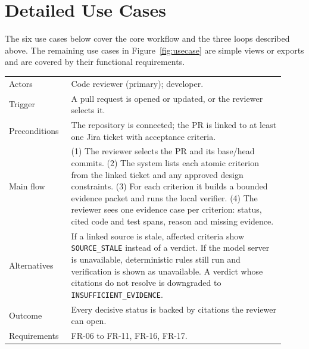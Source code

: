\section{Detailed Use Cases}
\label{sec:detailed-usecases}

The six use cases below cover the core workflow and the three loops described
above. The remaining use cases in Figure~\ref{fig:usecase} are simple views or
exports and are covered by their functional requirements.

\newcommand{\usecase}[8]{%
\begin{table}[htbp]
\centering\small
\begin{tabular}{>{\raggedright\arraybackslash}p{0.2\linewidth} >{\raggedright\arraybackslash}p{0.72\linewidth}}
\hline
\multicolumn{2}{l}{\textbf{#1}} \\
\hline
Actors & #2 \\
Trigger & #3 \\
Preconditions & #4 \\
Main flow & #5 \\
Alternatives & #6 \\
Outcome & #7 \\
Requirements & #8 \\
\hline
\end{tabular}
\end{table}}

\usecase{UC-01 \quad Verify a change against its linked intent}
  {Code reviewer (primary); developer.}
  {A pull request is opened or updated, or the reviewer selects it.}
  {The repository is connected; the PR is linked to at least one Jira ticket
   with acceptance criteria.}
  {(1) The reviewer selects the PR and its base/head commits.
   (2) The system lists each atomic criterion from the linked ticket and any
   approved design constraints.
   (3) For each criterion it builds a bounded evidence packet and runs the local
   verifier.
   (4) The reviewer sees one evidence case per criterion: status, cited code and
   test spans, reason and missing evidence.}
  {If a linked source is stale, affected criteria show \texttt{SOURCE\_STALE}
   instead of a verdict. If the model server is unavailable, deterministic rules
   still run and verification is shown as unavailable. A verdict whose
   citations do not resolve is downgraded to \texttt{INSUFFICIENT\_EVIDENCE}.}
  {Every decisive status is backed by citations the reviewer can open.}
  {FR-06 to FR-11, FR-16, FR-17.}

